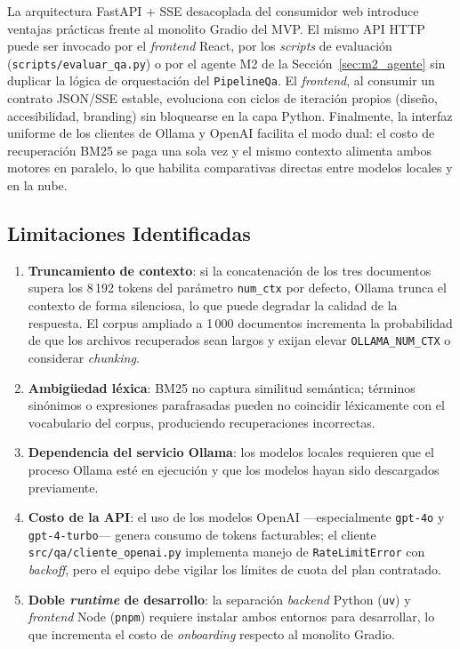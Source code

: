 \documentclass[conference]{IEEEtran}
\newcommand{\code}[1]{\texttt{\small #1}}
\begin{document}
La arquitectura FastAPI + SSE desacoplada del consumidor web introduce
ventajas prácticas frente al monolito Gradio del MVP. El mismo API HTTP
puede ser invocado por el \textit{frontend} React, por los \textit{scripts}
de evaluación (\code{scripts/evaluar\_qa.py}) o por el agente M2 de la
Sección~\ref{sec:m2_agente} sin duplicar la lógica de orquestación del
\code{PipelineQa}. El \textit{frontend}, al consumir un contrato JSON/SSE
estable, evoluciona con ciclos de iteración propios (diseño,
accesibilidad, branding) sin bloquearse en la capa Python. Finalmente, la
interfaz uniforme de los clientes de Ollama y OpenAI facilita el modo
dual: el costo de recuperación BM25 se paga una sola vez y el mismo
contexto alimenta ambos motores en paralelo, lo que habilita comparativas
directas entre modelos locales y en la nube.

\subsection{Limitaciones Identificadas}

\begin{enumerate}
    \item \textbf{Truncamiento de contexto}: si la concatenación de los tres
          documentos supera los 8\,192 tokens del parámetro \code{num\_ctx}
          por defecto, Ollama trunca el contexto de forma silenciosa, lo
          que puede degradar la calidad de la respuesta. El corpus ampliado
          a 1\,000 documentos incrementa la probabilidad de que los
          archivos recuperados sean largos y exijan elevar
          \code{OLLAMA\_NUM\_CTX} o considerar \textit{chunking}.
    \item \textbf{Ambigüedad léxica}: BM25 no captura similitud semántica;
          términos sinónimos o expresiones parafrasadas pueden no coincidir
          léxicamente con el vocabulario del corpus, produciendo recuperaciones
          incorrectas.
    \item \textbf{Dependencia del servicio Ollama}: los modelos locales
          requieren que el proceso Ollama esté en ejecución y que los modelos
          hayan sido descargados previamente.
    \item \textbf{Costo de la API}: el uso de los modelos OpenAI
          —especialmente \code{gpt-4o} y \code{gpt-4-turbo}— genera consumo
          de tokens facturables; el cliente
          \code{src/qa/cliente\_openai.py} implementa manejo de
          \code{RateLimitError} con \textit{backoff}, pero el equipo debe
          vigilar los límites de cuota del plan contratado.
    \item \textbf{Doble \textit{runtime} de desarrollo}: la separación
          \textit{backend} Python (\code{uv}) y \textit{frontend} Node
          (\code{pnpm}) requiere instalar ambos entornos para desarrollar,
          lo que incrementa el costo de \textit{onboarding} respecto al
          monolito Gradio.
\end{enumerate}
\end{document}

